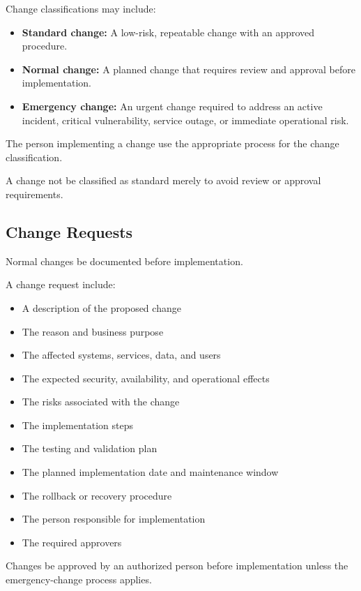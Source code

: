 Change classifications may include:
\begin{itemize}
    \item \textbf{Standard change:} A low-risk, repeatable change with an approved procedure.
    \item \textbf{Normal change:} A planned change that requires review and approval before implementation.
    \item \textbf{Emergency change:} An urgent change required to address an active incident, critical vulnerability, service outage, or immediate operational risk.
\end{itemize}

The person implementing a change \must{} use the appropriate process for the change classification.

A change \must{} not be classified as standard merely to avoid review or approval requirements.

\subsection{Change Requests}

Normal changes \must{} be documented before implementation.

A change request \must{} include:
\begin{itemize}
    \item A description of the proposed change
    \item The reason and business purpose
    \item The affected systems, services, data, and users
    \item The expected security, availability, and operational effects
    \item The risks associated with the change
    \item The implementation steps
    \item The testing and validation plan
    \item The planned implementation date and maintenance window
    \item The rollback or recovery procedure
    \item The person responsible for implementation
    \item The required approvers
\end{itemize}

Changes \must{} be approved by an authorized person before implementation unless the emergency-change process applies.

